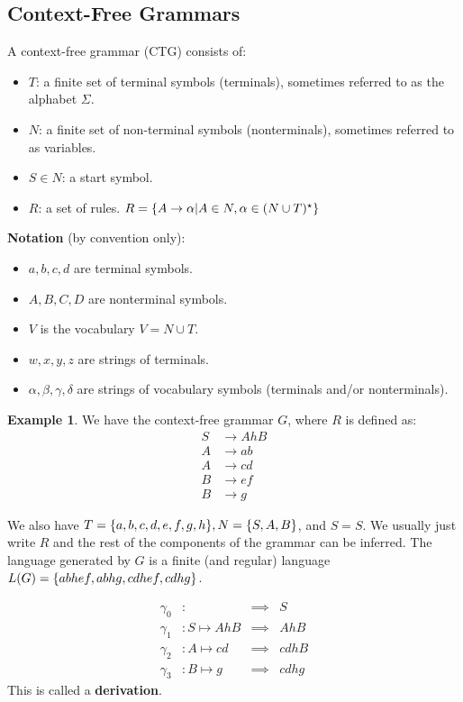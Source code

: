 \documentclass[]{article}
\DeclarePairedDelimiter{\set}{\lbrace}{\rbrace}
\theoremstyle{definition}
\newtheorem{ex}{Example}[section]
\begin{document}
		\subsection{Context-Free Grammars}
			A context-free grammar (CTG) consists of:
			\begin{itemize}
				\item $T$: a finite set of terminal symbols (terminals), sometimes referred to as the alphabet $\Sigma$.
				\item $N$: a finite set of non-terminal symbols (nonterminals), sometimes referred to as variables.
				\item $S \in N$: a start symbol.
				\item $R$: a set of rules. $R = \set{A \to \alpha | A \in N, \alpha \in (N \cup T)^\star}$
			\end{itemize}

			\textbf{Notation} (by convention only):
			\begin{itemize}
				\item $a, b, c, d$ are terminal symbols.
				\item $A, B, C, D$ are nonterminal symbols.
				\item $V$ is the vocabulary $V = N \cup T$.
				\item $w, x, y, z$ are strings of terminals.
				\item $\alpha, \beta, \gamma, \delta$ are strings of vocabulary symbols (terminals and/or nonterminals).
			\end{itemize}

			\begin{ex}
				We have the context-free grammar $G$, where $R$ is defined as:
				\begin{align*}
					S &\to AhB \\
					A &\to ab \\
					A &\to cd \\
					B &\to ef \\
					B &\to g
				\end{align*}

				We also have $T = \set{a, b, c, d, e, f, g, h}, N = \set{S, A, B}$, and $S = S$. We usually just write $R$ and the rest of the components of the grammar can be inferred. The language generated by $G$ is a finite (and regular) language $L(G) = \set{abhef, abhg, cdhef, cdhg}$.

				\begin{align*}
					\gamma_0&: &\implies& S \\
					\gamma_1&: S \mapsto AhB &\implies& AhB \\
					\gamma_2&: A \mapsto cd &\implies& cdhB \\
					\gamma_3&: B \mapsto g &\implies& cdhg
				\end{align*}
				This is called a \textbf{derivation}.
			\end{ex}
\end{document}
